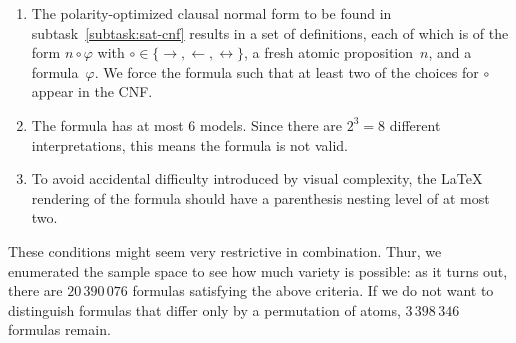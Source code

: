 \begin{enumerate}
    \item
        The polarity-optimized clausal normal form
        to be found in subtask~\ref{subtask:sat-cnf} results in a set of definitions,
        each of which is of the form
        $n \circ \varphi$ with $\circ \in \{ \rightarrow, \leftarrow, \leftrightarrow \}$,
        a fresh atomic proposition~$n$, and a formula~$\varphi$.
        We force the formula such that at least two of the choices for $\circ$ appear in the CNF.
    \item
        The formula has at most $6$ models.
        Since there are $2^3 = 8$ different interpretations,
        this means the formula is not valid.
    \item
        To avoid accidental difficulty introduced by visual complexity,
        the \LaTeX{} rendering of the formula should have a parenthesis nesting level of at most two.
\end{enumerate}

These conditions might seem very restrictive in combination.
Thur, we enumerated the sample space to see how much variety is possible:
as it turns out, there are $20\,390\,076$ formulas satisfying the above criteria.
If we do not want to distinguish formulas that differ only by a permutation of atoms,
$3\,398\,346$ formulas remain.

